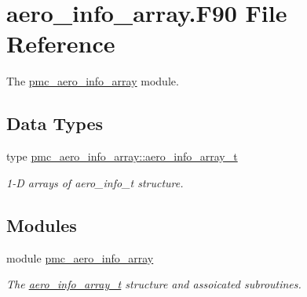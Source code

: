 \hypertarget{aero__info__array_8_f90}{}\section{aero\+\_\+info\+\_\+array.\+F90 File Reference}
\label{aero__info__array_8_f90}


The \mbox{\hyperlink{namespacepmc__aero__info__array}{pmc\+\_\+aero\+\_\+info\+\_\+array}} module.  


\subsection*{Data Types}
\begin{DoxyCompactItemize}
\item 
type \mbox{\hyperlink{structpmc__aero__info__array_1_1aero__info__array__t}{pmc\+\_\+aero\+\_\+info\+\_\+array\+::aero\+\_\+info\+\_\+array\+\_\+t}}
\begin{DoxyCompactList}\small\item\em 1-\/D arrays of aero\+\_\+info\+\_\+t structure. \end{DoxyCompactList}\end{DoxyCompactItemize}
\subsection*{Modules}
\begin{DoxyCompactItemize}
\item 
module \mbox{\hyperlink{namespacepmc__aero__info__array}{pmc\+\_\+aero\+\_\+info\+\_\+array}}
\begin{DoxyCompactList}\small\item\em The \mbox{\hyperlink{structpmc__aero__info__array_1_1aero__info__array__t}{aero\+\_\+info\+\_\+array\+\_\+t}} structure and assoicated subroutines. \end{DoxyCompactList}\end{DoxyCompactItemize}
